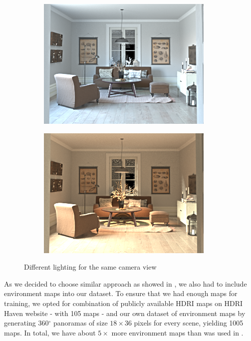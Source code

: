 \begin{figure}
\begin{subfigure}{0.4\linewidth}
    \includegraphics[width=\linewidth]{praca/images/AI43_008_Cam01.VRayLightSelect_RE_L1.png}
  \end{subfigure}
  \begin{subfigure}{0.4\linewidth}
    \includegraphics[width=\linewidth]{praca/images/AI43_008_Cam01.VRayLightSelect_RE_L4.png}
  \end{subfigure}
  \caption[Different lighting for the same camera view]{Different lighting for the same camera view}
  \label{fig:light-alternations}
\end{figure}
\noindent As we decided to choose similar approach as showed in \cite{sengupta-inverse-rendering}, we also had to include environment maps into our dataset. To ensure that we had enough maps for training, we opted for combination of publicly available HDRI maps on HDRI Haven website \cite{hdri-haven} - with 105 maps - and our own dataset of environment maps by generating 360$^{\circ}$ panoramas of size $18 \times 36$ pixels for every scene, yielding 1005 maps. In total, we have about $5\times$ more environment maps than was used in \cite{sengupta-inverse-rendering}.
